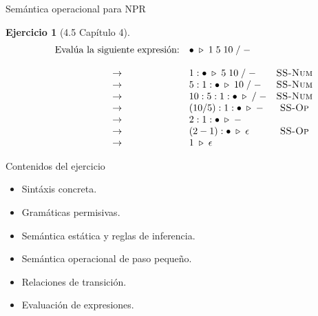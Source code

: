 \documentclass[11pt]{beamer}
\newtheorem{exercise}{Ejercicio}
\begin{document}
\begin{frame}{Semántica operacional para NPR}
	\begin{exercise}[4.5 Capítulo 4]
	\small
	
	\[
		\begin{array}{lclc}
			&  \text{Evalúa la siguiente expresión:}              &\bullet \;\triangleright\; 1\;5\;10\;/\;- \\ \\
			&\rightarrow& 1 : \bullet \;\triangleright\; 5\;10\;/\;- &\textsc{SS-Num} \\
			
			&\rightarrow& 5 : 1 : \bullet \;\triangleright\; 10\;/\;- & \textsc{SS-Num} \\
			
			&\rightarrow& 10 : 5 : 1 : \bullet \;\triangleright\; /\;- & \textsc{SS-Num} \\
			
			&\rightarrow& (10 / 5) : 1 : \bullet \;\triangleright\; - & \textsc{SS-Op} \\
			
			&\rightarrow& 2 : 1 : \bullet \;\triangleright\; - & \\
			
			&\rightarrow& (2 - 1) : \bullet \;\triangleright\; \epsilon & \textsc{SS-Op} \\
			
			&\rightarrow& 1 \;\triangleright\; \epsilon &
		\end{array}
	\]
	\end{exercise}
	
\end{frame}


\begin{frame}{Contenidos del ejercicio}
	\begin{itemize}
		\item Sintáxis concreta.
		\item Gramáticas permisivas.
		\item Semántica estática y reglas de inferencia.
		\item Semántica operacional de paso pequeño.
		\item Relaciones de transición.
		\item Evaluación de expresiones.
	\end{itemize}
\end{frame}
\end{document}
